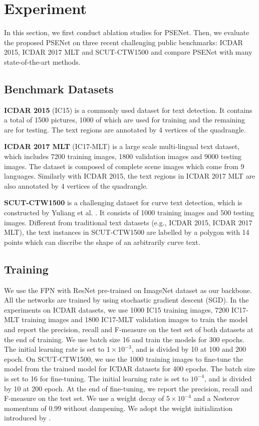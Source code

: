 \documentclass{article}
\begin{document}
\section{Experiment}
In this section, we first conduct ablation studies for PSENet. Then, we evaluate the proposed PSENet on three recent challenging public benchmarks: ICDAR 2015, ICDAR 2017 MLT and SCUT-CTW1500 and compare PSENet with many state-of-the-art methods.

\subsection{Benchmark Datasets}
{\bf{ICDAR 2015}} (IC15) \cite{karatzas2015icdar} is a commonly used dataset for text detection. It contains a total of 1500 pictures, 1000 of which are used for training and the remaining are for testing. The text regions are annotated by 4 vertices of the quadrangle.


{\bf{ICDAR 2017 MLT}} (IC17-MLT) \cite{icdar2017mlt} is a large scale multi-lingual text dataset, which includes 7200 training images, 1800 validation images and 9000 testing images. The dataset is composed of complete scene images which come from 9 languages. Similarly with ICDAR 2015, the text regions in ICDAR 2017 MLT are also annotated by 4 vertices of the quadrangle.


{\bf{SCUT-CTW1500}} is a challenging dataset for curve text detection, which is constructed by Yuliang et al. \cite{Liu2017Detecting}. It consists of 1000 training images and 500 testing images. Different from traditional text datasets (e.g., ICDAR 2015, ICDAR 2017 MLT), the text instances in SCUT-CTW1500 are labelled by a polygon with 14 points which can discribe the shape of an arbitrarily curve text.


\subsection{Training}
We use the FPN with ResNet \cite{he2016identity} pre-trained on ImageNet dataset \cite{deng2009imagenet} as our backbone. All the networks are trained by using stochastic gradient descent (SGD).
In the experiments on ICDAR datasets, we use 1000 IC15 training images, 7200 IC17-MLT training images and 1800 IC17-MLT validation images to train the model and report the precision, recall and F-measure on the test set of both datasets at the end of training. We use batch size 16 and train the models for 300 epochs. The initial learning rate is set to $1\times10^{-3}$, and is divided by 10 at 100 and 200 epoch. 
On SCUT-CTW1500, we use the 1000 training images to fine-tune the model from the trained model for ICDAR datasets for 400 epochs. The batch size is set to 16 for fine-tuning. The initial learning rate is set to $10^{-4}$, and is divided by 10 at 200 epoch. At the end of fine-tuning, we report the precision, recall and F-measure on the test set.
We use a weight decay of $5 \times 10^{-4}$ and a Nesterov momentum \cite{sutskever2013importance} of 0.99 without dampening. We adopt the weight initialization introduced by \cite{he2015delving}.
\end{document}

